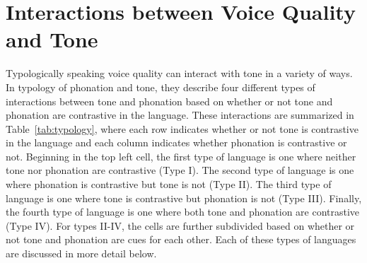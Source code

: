 
\section{Interactions between Voice Quality and Tone} \label{sec:interactions_between_voice_quality_and_tone}

Typologically speaking voice quality can interact with tone in a variety of ways. In  typology of phonation and tone, they describe four different types of interactions between tone and phonation based on whether or not tone and phonation are contrastive in the language. These interactions are summarized in Table~\ref{tab:typology}, where each row indicates whether or not tone is contrastive in the language and each column indicates whether phonation is contrastive or not. Beginning in the top left cell, the first type of language is one where neither tone nor phonation are contrastive (Type I). The second type of language is one where phonation is contrastive but tone is not (Type II). The third type of language is one where tone is contrastive but phonation is not (Type III). Finally, the fourth type of language is one where both tone and phonation are contrastive (Type IV). For types II-IV, the cells are further subdivided based on whether or not tone and phonation are cues for each other. Each of these types of languages are discussed in more detail below.

